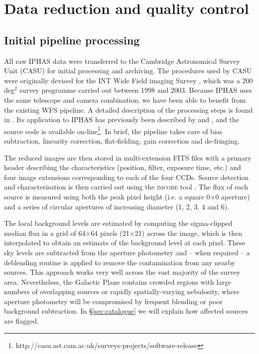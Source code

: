 \documentclass[a4paper,useAMS,usenatbib]{mn2e}
\begin{document}
\section{Data reduction and quality control}
\label{sec:reduction}

\subsection{Initial pipeline processing}

All raw IPHAS data were transferred
to the Cambridge Astronomical Survey Unit (CASU) 
for initial processing and archiving.
The procedures used by CASU were originally devised
for the INT Wide Field imaging Survey \citep[WFS;][]{McMahon2001,Irwin2005},
which was a 200 deg$^2$ survey programme carried out 
between 1998 and 2003.
Because IPHAS uses the same telescope and camera combination,
we have been able to benefit from the existing WFS pipeline.
A detailed description of the processing steps 
is found in \citet{Irwin2001}.
Its application to IPHAS has previously been described
by \citet{Drew2005} and \citet{Gonzalez-Solares2008},
and the source code is available
on-line\footnote{http://casu.ast.cam.ac.uk/surveys-projects/software-release}. 
In brief, the pipeline takes care of bias subtraction,
linearity correction, flat-fielding,
gain correction and de-fringing.

The reduced images are then stored in multi-extension FITS files
with a primary header describing the characteristics
(position, filter, exposure time, etc.) 
and four image extensions 
corresponding to each of the four CCDs.
Source detection and characterisation is then carried out 
using the \textsc{imcore} tool \citep{Irwin1985,Irwin1997}.
The flux of each source is measured using both
the peak pixel height
(i.e. a square 0$\times$0 aperture)
and a series of circular apertures of increasing diameter 
(1, 2, 3, 4 and 6).

The local background levels are estimated 
by computing the sigma-clipped median
flux in a grid of 64$\times$64 pixels (21\arcsec$\times$21\arcsec)
across the image,
which is then interpolated to obtain an estimate 
of the background level at each pixel.
These sky levels are subtracted from the aperture photometry and
-- when required --
a deblending routine is applied to remove
the contamination from any nearby sources.
This approach works very well 
across the vast majority of the survey area.  Nevertheless,
the Galactic Plane contains crowded regions 
with large numbers of overlapping sources
or rapidly spatially-varying nebulosity,
where aperture photometry will be compromised by frequent blending
or poor background subtraction.
In \S\ref{sec:catalogue} we will explain how affected sources are 
flagged. 
\end{document}
